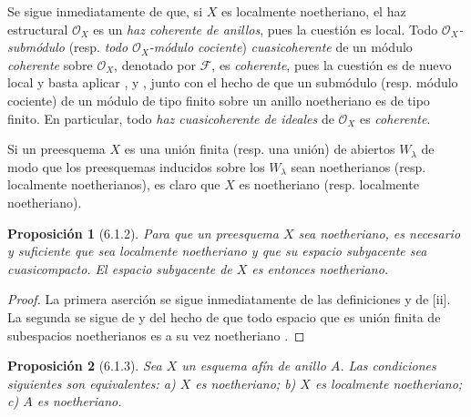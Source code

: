 \documentclass[oneside]{amsart}
\theoremstyle{ega-env-style}
\theoremstyle{ega-thm-env-style}
\newtheorem*{proposition}{Proposición}
\theoremstyle{ega-defn-env-style}
\newcommand{\oldpage}[2][]{{\marginnote{\normalfont{\textbf{#1}~|~#2}}}\ignorespaces}
\let\EGAOriginalLabel\label
\renewcommand{\label}[1]{\phantomsection\EGAOriginalLabel{#1}}
\begin{document}
Se sigue inmediatamente de  que, si $X$ es localmente noetheriano, el haz estructural $\mathscr{O}_X$ es un \emph{haz coherente de anillos}, pues la cuestión es local.
Todo \emph{$\mathscr{O}_X$-submódulo}
\oldpage[I]{141}
(resp. \emph{todo $\mathscr{O}_X$-módulo cociente}) \emph{cuasicoherente} de un módulo \emph{coherente} sobre $\mathscr{O}_X$, denotado por $\mathscr{F}$, es \emph{coherente}, pues la cuestión es de nuevo local y basta aplicar ,  y , junto con el hecho de que un submódulo (resp. módulo cociente) de un módulo de tipo finito sobre un anillo noetheriano es de tipo finito.
En particular, todo \emph{haz cuasicoherente de ideales} de $\mathscr{O}_X$ es \emph{coherente}.

Si un preesquema $X$ es una unión finita (resp. una unión) de abiertos $W_\lambda$ de modo que los preesquemas inducidos sobre los $W_\lambda$ sean noetherianos (resp. localmente noetherianos), es claro que $X$ es noetheriano (resp. localmente noetheriano).

\begin{proposition}[6.1.2]
\label{I.6.1.2}
Para que un preesquema $X$ sea noetheriano, es necesario y suficiente que sea localmente noetheriano y que su espacio subyacente sea cuasicompacto.
El espacio subyacente de $X$ es entonces noetheriano.
\end{proposition}

\begin{proof}
La primera aserción se sigue inmediatamente de las definiciones y de [ii].
La segunda se sigue de  y del hecho de que todo espacio que es unión finita de subespacios noetherianos es a su vez noetheriano .
\end{proof}

\begin{proposition}[6.1.3]
\label{I.6.1.3}
Sea $X$ un esquema afín de anillo $A$.
Las condiciones siguientes son equivalentes:
\textup{a)} $X$ es noetheriano;
\textup{b)} $X$ es localmente noetheriano;
\textup{c)} $A$ es noetheriano.
\end{proposition}
\end{document}
